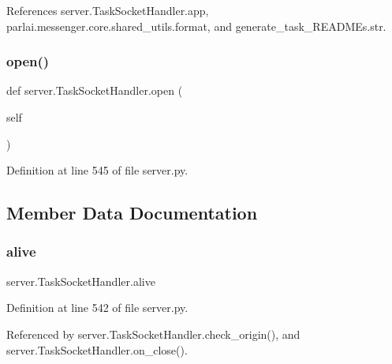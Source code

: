 References server.\+Task\+Socket\+Handler.\+app, parlai.\+messenger.\+core.\+shared\+\_\+utils.\+format, and generate\+\_\+task\+\_\+\+R\+E\+A\+D\+M\+Es.\+str.

\mbox{\label{classserver_1_1TaskSocketHandler_a815e99396d5eae54037b0dea06280f54}} 
\subsubsection{\texorpdfstring{open()}{open()}}
{\footnotesize\ttfamily def server.\+Task\+Socket\+Handler.\+open (\begin{DoxyParamCaption}\item[{}]{self }\end{DoxyParamCaption})}



Definition at line 545 of file server.\+py.



\subsection{Member Data Documentation}
\mbox{\label{classserver_1_1TaskSocketHandler_ac3812d20429f441bb67a5b122eac1448}} 
\subsubsection{\texorpdfstring{alive}{alive}}
{\footnotesize\ttfamily server.\+Task\+Socket\+Handler.\+alive}



Definition at line 542 of file server.\+py.



Referenced by server.\+Task\+Socket\+Handler.\+check\+\_\+origin(), and server.\+Task\+Socket\+Handler.\+on\+\_\+close().

\mbox{\label{classserver_1_1TaskSocketHandler_a85a1a3e1871a02e4024bfbefdfdacdb8}} 
